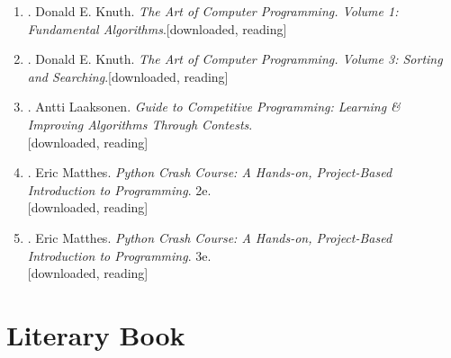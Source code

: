 \documentclass{article}
\begin{document}
\begin{enumerate}
	\item \cite{Knuth1997}. Donald E. Knuth. \textit{The Art of Computer Programming. Volume 1: Fundamental Algorithms}.\hfill\textsf{[downloaded, reading]}
	\item \cite{Knuth1998}. Donald E. Knuth. \textit{The Art of Computer Programming. Volume 3: Sorting and Searching}.\hfill\textsf{[downloaded, reading]}
	\item \cite{Laaksonen2020}. Antti Laaksonen. \textit{Guide to Competitive Programming: Learning \& Improving Algorithms Through Contests}.\\\mbox{}\hfill\textsf{[downloaded, reading]}
	\item \cite{Matthes2019}. Eric Matthes. \textit{Python Crash Course: A Hands-on, Project-Based Introduction to Programming}. 2e.\\\mbox{}\hfill\textsf{[downloaded, reading]}
	\item \cite{Matthes2023}. Eric Matthes. \textit{Python Crash Course: A Hands-on, Project-Based Introduction to Programming}. 3e.\\\mbox{}\hfill\textsf{[downloaded, reading]}
\end{enumerate}


\section{Literary Book}
\end{document}
